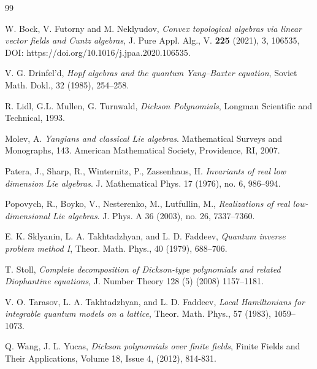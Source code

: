\documentclass[10pt]{article}%
\numberwithin{equation}{section}
\begin{document}
\begin{thebibliography}{99}

 W. Bock, V. Futorny and M. Neklyudov, {\em Convex topological algebras via linear vector fields and Cuntz algebras}, J. Pure Appl. Alg., V. {\bf 225} (2021), 3, 106535, DOI: https://doi.org/10.1016/j.jpaa.2020.106535.


 V. G. Drinfel’d, {\it Hopf algebras and the quantum Yang–Baxter equation}, Soviet Math. Dokl., 32 (1985), 254–258.

 R. Lidl, G.L. Mullen, G. Turnwald, {\it Dickson Polynomials}, Longman Scientific and Technical, 1993.

 Molev, A.
{\it Yangians and classical Lie algebras}.
Mathematical Surveys and Monographs, 143. American Mathematical Society, Providence, RI, 2007. 

 Patera, J., Sharp, R., Winternitz, P., Zassenhaus, H.
{\it Invariants of real low dimension Lie algebras}.
J. Mathematical Phys. 17 (1976), no. 6, 986–994.

 Popovych, R., Boyko, V., Nesterenko, M., Lutfullin, M.,
{\it Realizations of real low-dimensional Lie algebras}. 
J. Phys. A 36 (2003), no. 26, 7337–7360.

 E. K. Sklyanin, L. A. Takhtadzhyan, and L. D. Faddeev, {\it Quantum inverse problem method I}, Theor. Math. Phys., 40 (1979), 688–706.

 T. Stoll, {\it Complete decomposition of Dickson-type polynomials and related Diophantine equations}, J. Number Theory 128 (5)
(2008) 1157–1181.

 V. O. Tarasov, L. A. Takhtadzhyan, and L. D. Faddeev, {\it Local Hamiltonians for integrable quantum models on a lattice}, Theor. Math. Phys., 57  (1983), 1059–1073.

 Q. Wang, J. L. Yucas,
{\it Dickson polynomials over finite fields},
Finite Fields and Their Applications,
Volume 18, Issue 4,
(2012), 814-831.

\end{thebibliography}
\end{document}
